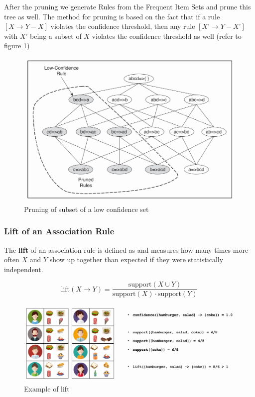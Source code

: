 \documentclass[11pt]{article}
\begin{document}
After the pruning we generate Rules from the Frequent Item Sets and prune this tree as well. The method for pruning is based on the fact that if a rule $[X \rightarrow Y - X]$ violates the confidence threshold, then any rule $[X’ \rightarrow Y - X’]$ with $X’$ being a subset of $X$ violates the confidence threshold as well (refer to figure \ref{fig:subsetpruning})

\begin{figure}[tbh!]
    \centering
    \includegraphics[width=0.7\linewidth, keepaspectratio]{Pictures/subset_pruning}
    \caption{Pruning of subset of a low confidence set}
    \label{fig:subsetpruning}
\end{figure}

\subsubsection{Lift of an Association Rule}

The \textbf{lift} of an association rule is defined as and measures how many times more often $X$ and $Y$ show up together than expected if they were statistically independent.

\begin{equation*}
    \text{lift}(X\rightarrow Y) = \frac{\text{support}(X\cup Y)}{\text{support}(X)\cdot\text{support}(Y)}
\end{equation*}

\begin{figure}[tbh!]
    \centering
    \includegraphics[width=0.7\linewidth, keepaspectratio]{Pictures/lift_association_rule}
    \caption{Example of lift}
    \label{fig:liftassociationrule}
\end{figure}
\end{document}
